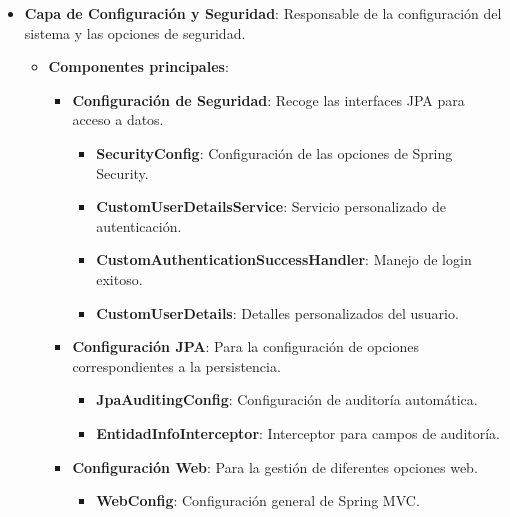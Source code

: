 \begin{itemize}
	\item \textbf{Capa de Configuración y Seguridad}: Responsable de la configuración del sistema y las opciones de seguridad.
	\begin{itemize}
       \item \textbf{Componentes principales}: 
       	\begin{itemize}
               \item \textbf{Configuración de Seguridad}: Recoge las interfaces JPA para acceso a datos.
           	\begin{itemize}
                   \item \textbf{SecurityConfig}: Configuración de las opciones de Spring Security.
                   \item \textbf{CustomUserDetailsService}: Servicio personalizado de autenticación.
                   \item \textbf{CustomAuthenticationSuccessHandler}: Manejo de login exitoso.
                   \item \textbf{CustomUserDetails}: Detalles personalizados del usuario.
                \end{itemize}

               \item \textbf{Configuración JPA}: Para la configuración de opciones correspondientes a la persistencia.
           	\begin{itemize}
                   \item \textbf{JpaAuditingConfig}: Configuración de auditoría automática.
                   \item \textbf{EntidadInfoInterceptor}: Interceptor para campos de auditoría.
                \end{itemize}

               \item \textbf{Configuración Web}: Para la gestión de diferentes opciones web.
           	\begin{itemize}
                   \item \textbf{WebConfig}: Configuración general de Spring MVC.
                \end{itemize}
            \end{itemize}
    \end{itemize}


\end{itemize}
